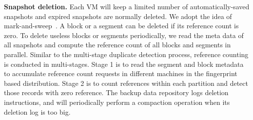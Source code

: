 {\bf Snapshot deletion.} Each VM will keep a limited number of  automatically-saved snapshots and 
expired snapshots are normally deleted.
We adopt the idea of mark-and-sweep~\cite{Guo2011}. 
A block or a segment can be deleted if its reference count is zero.
To delete useless  blocks or segments periodically, we read the meta data  of all
snapshots and compute the reference count of all blocks and segments  in parallel.
Similar to the multi-stage duplicate detection process, reference counting is conducted in multi-stages. 
Stage  1 is to read  the segment and block  metadata 
to accumulate  reference count requests in different machines  in the fingerprint based distribution.
Stage   2 is to count references within each partition and detect those records with zero 
reference. 
The backup  data repository logs deletion instructions,  and will periodically perform a compaction operation when 
its deletion log is too big. 




